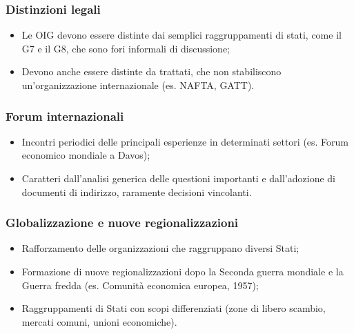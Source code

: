 \documentclass{article}
\begin{document}
\subsubsection{Distinzioni legali}
\begin{itemize}
    \item Le OIG devono essere distinte dai semplici raggruppamenti di stati, come il G7 e il
        G8, che sono fori informali di discussione;
    \item Devono anche essere distinte da trattati, che non stabiliscono un'organizzazione
        internazionale (es. NAFTA, GATT).
\end{itemize}

\subsubsection{Forum internazionali}
\begin{itemize}
    \item Incontri periodici delle principali esperienze in determinati settori (es. Forum
        economico mondiale a Davos);
    \item Caratteri dall'analisi generica delle questioni importanti e dall'adozione di
        documenti di indirizzo, raramente decisioni vincolanti.
\end{itemize}

\subsubsection{Globalizzazione e nuove regionalizzazioni}
\begin{itemize}
    \item Rafforzamento delle organizzazioni che raggruppano diversi Stati;
    \item Formazione di nuove regionalizzazioni dopo la Seconda guerra mondiale e la Guerra
        fredda (es. Comunità economica europea, 1957);
    \item Raggruppamenti di Stati con scopi differenziati (zone di libero scambio, mercati
        comuni, unioni economiche).
\end{itemize}
\end{document}
